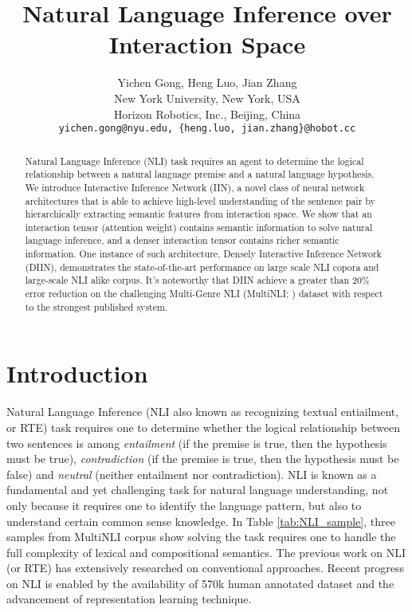 \documentclass{article} \usepackage{iclr2018_conference,times}
\title{Natural Language Inference over \\Interaction Space}
\author{Yichen Gong, Heng Luo, Jian Zhang \\
 New York University, New York, USA \\
 Horizon Robotics, Inc., Beijing, China \\
\texttt{yichen.gong@nyu.edu, \{heng.luo, jian.zhang\}@hobot.cc}
}
\begin{document}
\maketitle

\begin{abstract}
Natural Language Inference (NLI) task requires an agent to determine the logical relationship between a natural language premise and a natural language hypothesis. We introduce Interactive Inference Network (IIN), a novel class of neural network architectures that is able to achieve high-level understanding of the sentence pair by hierarchically extracting semantic features from interaction space. We show that an interaction tensor (attention weight) contains semantic information to solve natural language inference, and a denser interaction tensor contains richer semantic information. One instance of such architecture, Densely Interactive Inference Network (DIIN), demonstrates the state-of-the-art performance on large scale NLI copora and large-scale NLI alike corpus. It's noteworthy that DIIN achieve a greater than 20\% error reduction on the challenging Multi-Genre NLI (MultiNLI; \citealt{MultiNLI_Williams:2017tk}) dataset with respect to the strongest published system.
\end{abstract}

\section{Introduction}

Natural Language Inference (NLI also known as recognizing textual entiailment, or RTE) task requires one to determine whether the logical relationship between two sentences is among \textit{entailment} (if the premise is true, then the hypothesis must be true), \textit{contradiction} (if the premise is true, then the hypothesis must be false) and \textit{neutral} (neither entailment nor contradiction). NLI is known as a fundamental and yet challenging task for natural language understanding\citep{MultiNLI_Williams:2017tk}, not only because it requires one to identify the language pattern, but also to understand certain common sense knowledge. In Table \ref{tab:NLI_sample}, three samples from MultiNLI corpus show solving the task requires one to handle the full complexity of lexical and compositional semantics.
The previous work on NLI (or RTE) has extensively researched on conventional approaches\citep{aNLIsystem_Fyodorov:2000uy, RTR_LI_Bos:2005vn, EMNL_MacCartney:2009dn}. Recent progress on NLI is enabled by the availability of 570k human annotated dataset\citep{snli_2015arXiv150805326B} and the advancement of representation learning technique.
\end{document}

